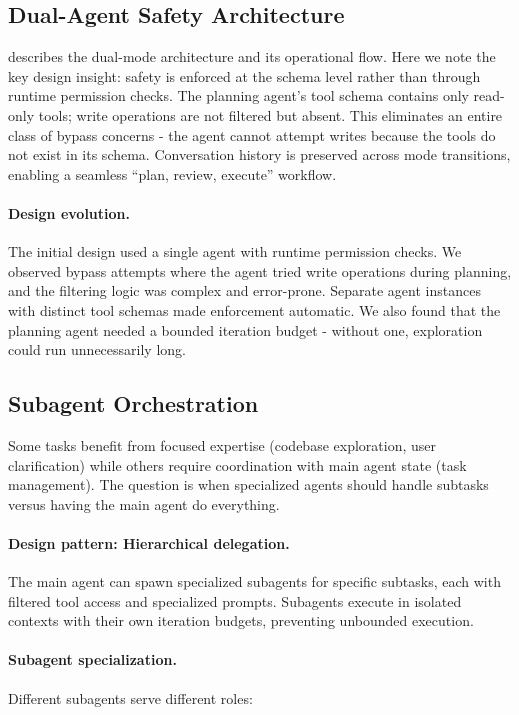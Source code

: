\subsection{Dual-Agent Safety Architecture}
\label{sec:dual_agent}

 describes the dual-mode architecture and its operational flow. Here we note the key design insight: safety is enforced at the schema level rather than through runtime permission checks. The planning agent's tool schema contains only read-only tools; write operations are not filtered but absent. This eliminates an entire class of bypass concerns - the agent cannot attempt writes because the tools do not exist in its schema. Conversation history is preserved across mode transitions, enabling a seamless ``plan, review, execute'' workflow.

\paragraph{Design evolution.} The initial design used a single agent with runtime permission checks. We observed bypass attempts where the agent tried write operations during planning, and the filtering logic was complex and error-prone. Separate agent instances with distinct tool schemas made enforcement automatic. We also found that the planning agent needed a bounded iteration budget - without one, exploration could run unnecessarily long.

\subsection{Subagent Orchestration}
\label{sec:subagents}

Some tasks benefit from focused expertise (codebase exploration, user clarification) while others require coordination with main agent state (task management). The question is when specialized agents should handle subtasks versus having the main agent do everything.

\paragraph{Design pattern: Hierarchical delegation.} The main agent can spawn specialized subagents for specific subtasks, each with filtered tool access and specialized prompts. Subagents execute in isolated contexts with their own iteration budgets, preventing unbounded execution.

\paragraph{Subagent specialization.} Different subagents serve different roles:

